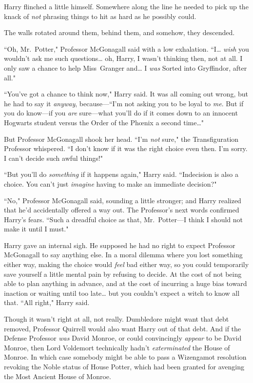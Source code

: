 Harry flinched a little himself. Somewhere along the line he needed to pick up the knack of \emph{not} phrasing things to hit as hard as he possibly could.

The walls rotated around them, behind them, and somehow, they descended.

``Oh, Mr.~Potter," Professor McGonagall said with a low exhalation. ``I{\ldots} \emph{wish} you wouldn't ask me such questions{\ldots} oh, Harry, I wasn't thinking then, not at all. I only saw a chance to help Miss~Granger and{\ldots} I \emph{was} Sorted into Gryffindor, after all."

``You've got a chance to think now," Harry said. It was all coming out wrong, but he had to say it \emph{anyway}, because—``I'm not asking you to be loyal to \emph{me}. But if you do know—if you \emph{are} sure—what you'll do if it comes down to an innocent Hogwarts student versus the Order of the Phœnix a second time{\ldots}"

But Professor McGonagall shook her head. ``I'm \emph{not} sure," the Transfiguration Professor whispered. ``I don't know if it was the right choice even then. I'm sorry. I can't decide such awful things!"

``But you'll do \emph{something} if it happens again," Harry said. ``Indecision is also a choice. You can't just \emph{imagine} having to make an immediate decision?"

``No," Professor McGonagall said, sounding a little stronger; and Harry realized that he'd accidentally offered a way out. The Professor's next words confirmed Harry's fears. ``Such a dreadful choice as that, Mr.~Potter—I think I should not make it until I must."

Harry gave an internal sigh. He supposed he had no right to expect Professor McGonagall to say anything else. In a moral dilemma where you lost something either way, making the choice would \emph{feel} bad either way, so you could temporarily save yourself a little mental pain by refusing to decide. At the cost of not being able to plan anything in advance, and at the cost of incurring a huge bias toward inaction or waiting until too late{\ldots} but you couldn't expect a witch to know all that. ``All right," Harry said.

Though it wasn't right at all, not really. Dumbledore might want that debt removed, Professor Quirrell would also want Harry out of that debt. And if the Defense Professor \emph{was} David Monroe, or could convincingly \emph{appear} to be David Monroe, then Lord Voldemort technically hadn't \emph{exterminated} the House of Monroe. In which case somebody might be able to pass a Wizengamot resolution revoking the Noble status of House Potter, which had been granted for avenging the Most Ancient House of Monroe.


